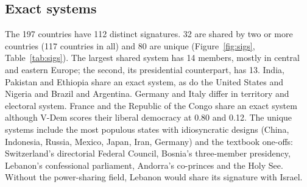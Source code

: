 \documentclass[11pt,a4paper]{article}
\begin{document}
\subsection{Exact systems}
The 197 countries have 112 distinct signatures. 32 are shared by two or more countries (117 countries in all) and 80 are unique (Figure~\ref{fig:sigs}, Table~\ref{tab:sigs}). The largest shared system has 14 members, mostly in central and eastern Europe; the second, its presidential counterpart, has 13. India, Pakistan and Ethiopia share an exact system, as do the United States and Nigeria and Brazil and Argentina. Germany and Italy differ in territory and electoral system. France and the Republic of the Congo share an exact system although V-Dem scores their liberal democracy at 0.80 and 0.12. The unique systems include the most populous states with idiosyncratic designs (China, Indonesia, Russia, Mexico, Japan, Iran, Germany) and the textbook one-offs: Switzerland's directorial Federal Council, Bosnia's three-member presidency, Lebanon's confessional parliament, Andorra's co-princes and the Holy See. Without the power-sharing field, Lebanon would share its signature with Israel.
\end{document}
